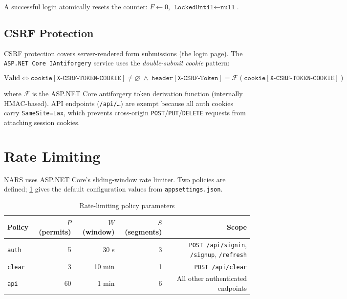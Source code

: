 \documentclass[12pt,a4paper]{article}
\theoremstyle{definition}
\theoremstyle{plain}
\theoremstyle{remark}
\begin{document}
A successful login atomically resets the counter:
$F \leftarrow 0$, $\texttt{LockedUntil} \leftarrow \texttt{null}$.

\subsection{CSRF Protection}

CSRF protection covers server-rendered form submissions (the login page).
The \texttt{ASP.NET Core IAntiforgery} service uses the \emph{double-submit
cookie} pattern:

\begin{equation}
  \text{Valid} \iff
    \texttt{cookie}[\texttt{X-CSRF-TOKEN-COOKIE}] \neq \varnothing
    \;\land\;
    \texttt{header}[\texttt{X-CSRF-Token}]
    = \mathcal{F}\!\left(\texttt{cookie}[\texttt{X-CSRF-TOKEN-COOKIE}]\right)
  \label{eq:csrf}
\end{equation}

where $\mathcal{F}$ is the ASP.NET Core antiforgery token derivation
function (internally HMAC-based). API endpoints (\texttt{/api/\ldots}) are
exempt because all auth cookies carry \texttt{SameSite=Lax}, which
prevents cross-origin \texttt{POST}/\texttt{PUT}/\texttt{DELETE} requests
from attaching session cookies.

\section{Rate Limiting}
\label{sec:ratelimit}

NARS uses ASP.NET Core's sliding-window rate limiter. Two policies are
defined; \cref{tab:rate_limits} gives the default configuration values
from \texttt{appsettings.json}.

\begin{table}[H]
\centering
\caption{Rate-limiting policy parameters}
\label{tab:rate_limits}
\begin{tabular}{lrrrr}
\toprule
\textbf{Policy} & $P$ (permits) & $W$ (window) & $S$ (segments) & \textbf{Scope} \\
\midrule
\texttt{auth}  & 5  & 30 s & 3 & \texttt{POST /api/signin}, \texttt{/signup}, \texttt{/refresh} \\
\texttt{clear} & 3  & 10 min & 1 & \texttt{POST /api/clear} \\
\texttt{api}   & 60 & 1 min  & 6 & All other authenticated endpoints \\
\bottomrule
\end{tabular}
\end{table}
\end{document}
